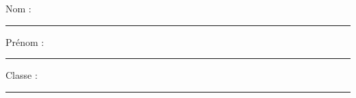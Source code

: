 \documentclass[../Cours.tex]{subfiles}
\begin{document}
\clearpage
\thispagestyle{empty}

\newcommand{\bionic}[2][0.5]{%
\StrCut{#2}{ }{\nextword}{\otherwords}%
\exploregroups%
\StrLen{\nextword}[\currlen]%
\edef\halflen{\fpeval{ceil(\currlen*#1)}}%
\bfseries\StrLeft{\nextword}{\halflen}%
\normalfont\StrGobbleLeft{\nextword}{\halflen}\space%
\noexploregroups%
\IfStrEq{\otherwords}{}{}{%
\bionic[#1]{\otherwords}%
}}

\setcounter{DS}{1}

\newcommand{\nomPrenom}{%
    Nom : \rule{2cm}{1pt}  \hfill Prénom : \rule{2cm}{1pt} \hfill Classe : \rule{2cm}{1pt}
}

\newcommand{\caseReponse}[1]{%
    \vspace{-1.2em}%
    \begin{center}
    \begin{tikzpicture}
        \draw (0,0) rectangle (\textwidth,#1);
    \end{tikzpicture}
    \end{center}
}

\color{black}
\nomPrenom
\titreDS
\end{document}
